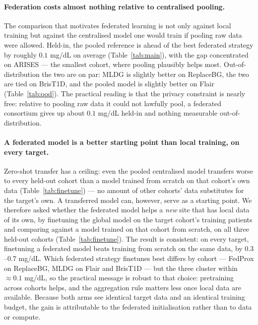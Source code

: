 \documentclass[10pt,letterpaper]{article}
\begin{document}
\paragraph{Federation costs almost nothing relative to centralised pooling.}
The comparison that motivates federated learning is not only against local
training but against the centralised model one would train if pooling raw data
were allowed. Held-in, the pooled reference is ahead of the best federated
strategy by roughly $0.1$ mg/dL on average (Table~\ref{tab:main}), with the gap
concentrated on ARISES --- the smallest cohort, where pooling plausibly helps
most. Out-of-distribution the two are on par: MLDG is slightly better on
ReplaceBG, the two are tied on BrisT1D, and the pooled model is slightly better
on Flair (Table~\ref{tab:ood}). The practical reading is that the privacy
constraint is nearly free: relative to pooling raw data it could not lawfully
pool, a federated consortium gives up about $0.1$ mg/dL held-in and nothing
measurable out-of-distribution.

\paragraph{A federated model is a better starting point than local training, on
every target.} Zero-shot transfer has a ceiling: even the pooled centralised
model transfers worse to every held-out cohort than a model trained from scratch
on that cohort's own data (Table~\ref{tab:finetune}) --- no amount of other
cohorts' data substitutes for the target's own. A transferred model can,
however, serve as a starting point. We therefore asked whether the federated
model helps a \emph{new} site that has local data of its own, by finetuning the
global model on the target cohort's training patients and comparing against a
model trained on that cohort from scratch, on all three held-out cohorts
(Table~\ref{tab:finetune}). The
result is consistent: on every target, finetuning a federated model beats training
from scratch on the same data, by $0.3$--$0.7$ mg/dL. Which federated strategy
finetunes best differs by cohort
--- FedProx on ReplaceBG, MLDG on Flair and
BrisT1D --- but the three cluster within $\approx 0.1$ mg/dL, so the practical
message is robust to that choice: pretraining across cohorts helps, and the
aggregation rule matters less once local data are available. Because both arms see
identical target data and an identical training budget, the gain is attributable
to the federated initialisation rather than to data or compute.
\end{document}
